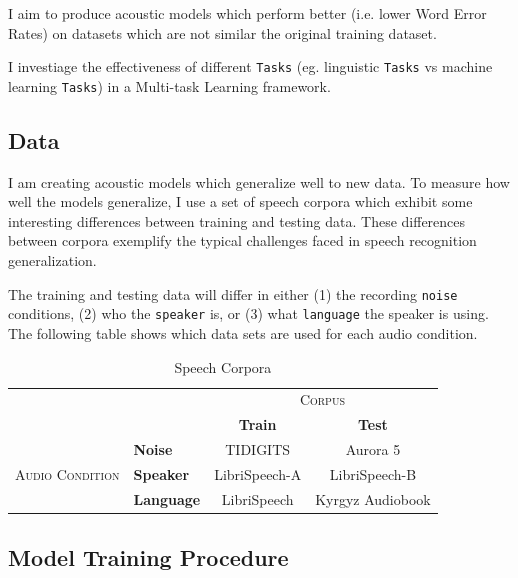 \documentclass[10pt,a4paper]{article}
\begin{document}
I aim to produce acoustic models which perform better (i.e. lower Word Error Rates) on datasets which are not similar the original training dataset.

I investiage the effectiveness of different \texttt{Tasks} (eg. linguistic \texttt{Tasks} vs machine learning \texttt{Tasks}) in a Multi-task Learning framework.


\subsection{Data}

I am creating acoustic models which generalize well to new data. To measure how well the models generalize, I use a set of speech corpora which exhibit some interesting differences between training and testing data. These differences between corpora exemplify the typical challenges faced in speech recognition generalization.

The training and testing data will differ in either (1) the recording \texttt{noise} conditions, (2) who the \texttt{speaker} is, or (3) what \texttt{language} the speaker is using. The following table shows which data sets are used for each audio condition.


\begin{table}[!htbp]
  \centering
  \begin{adjustbox}{width=.75\textwidth}
    \begin{tabular}{clcc}
      \toprule
      && \multicolumn{2}{c}{\textsc{Corpus}}\\
      && \textbf{Train} & \textbf{Test}\\
      \midrule
      \multirow{3}{*}{\textsc{Audio Condition}} &\textbf{Noise} & TIDIGITS & Aurora 5 \\
      &\textbf{Speaker} & LibriSpeech-A & LibriSpeech-B \\
      &\textbf{Language} & LibriSpeech & Kyrgyz Audiobook \\
      \bottomrule
    \end{tabular}
    \label{table:data}
  \end{adjustbox}
  
  \caption{Speech Corpora}
  
\end{table}


\subsection{Model Training Procedure}
\end{document}
